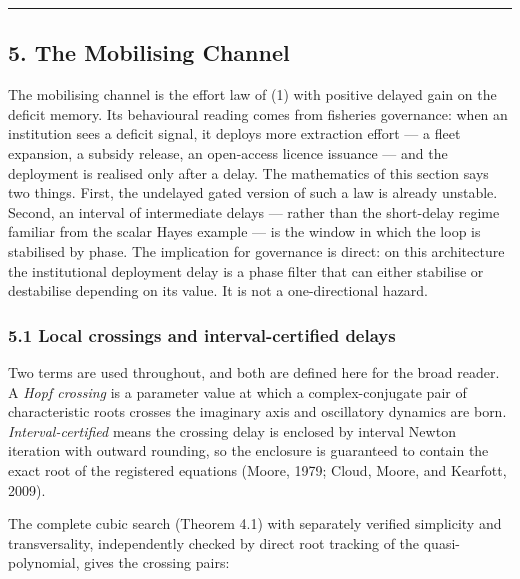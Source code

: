 \documentclass[11pt]{article}
\begin{document}
\begin{center}\rule{0.5\linewidth}{0.5pt}\end{center}

\subsection{5. The Mobilising Channel}\label{the-mobilising-channel}

The mobilising channel is the effort law of (1) with positive delayed
gain on the deficit memory. Its behavioural reading comes from fisheries
governance: when an institution sees a deficit signal, it deploys more
extraction effort --- a fleet expansion, a subsidy release, an
open-access licence issuance --- and the deployment is realised only
after a delay. The mathematics of this section says two things. First,
the undelayed gated version of such a law is already unstable. Second,
an interval of intermediate delays --- rather than the short-delay
regime familiar from the scalar Hayes example --- is the window in which
the loop is stabilised by phase. The implication for governance is
direct: on this architecture the institutional deployment delay is a
phase filter that can either stabilise or destabilise depending on its
value. It is not a one-directional hazard.

\subsubsection{5.1 Local crossings and interval-certified
delays}\label{local-crossings-and-interval-certified-delays}

Two terms are used throughout, and both are defined here for the broad
reader. A \emph{Hopf crossing} is a parameter value at which a
complex-conjugate pair of characteristic roots crosses the imaginary
axis and oscillatory dynamics are born. \emph{Interval-certified} means
the crossing delay is enclosed by interval Newton iteration with outward
rounding, so the enclosure is guaranteed to contain the exact root of
the registered equations (Moore, 1979; Cloud, Moore, and Kearfott,
2009).

The complete cubic search (Theorem 4.1) with separately verified
simplicity and transversality, independently checked by direct root
tracking of the quasi-polynomial, gives the crossing pairs:
\end{document}

